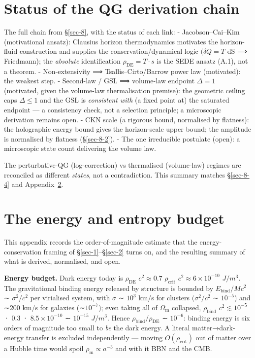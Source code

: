 \documentclass[preprint,12pt]{elsarticle}
\begin{document}
\section{Status of the QG derivation chain}\label{sec-E}

The full chain from §\ref{sec-8}, with the status of each link: -
Jacobson--Cai--Kim (motivational ansatz): Clausius horizon
thermodynamics motivates the horizon-fluid construction and supplies the
conservation/dynamical logic \((\delta Q = T\) dS ⟹ Friedmann); the
\emph{absolute} identification \(\rho _\mathrm{DE} = T\cdot s\) is the
SEDE ansatz (A.1), not a theorem. - Non-extensivity ⟹
Tsallis--Cirto/Barrow power law (motivated): the weakest step. -
Second-law / GSL ⟹ volume-law endpoint \(\Delta  = 1\) (motivated, given
the volume-law thermalisation premise): the geometric ceiling caps
\(\Delta  \leq  1\) and the GSL is \emph{consistent with} (a fixed point
at) the saturated endpoint --- a consistency check, not a selection
principle; a microscopic derivation remains open. - CKN scale (a
rigorous bound, normalised by flatness): the holographic energy bound
gives the horizon-scale upper bound; the amplitude is normalised by
flatness (§\ref{sec-8-2}). - The one irreducible postulate (open): a
microscopic state count delivering the volume law.

The perturbative-QG (log-correction) vs thermalised (volume-law) regimes
are reconciled as different \emph{states}, not a contradiction. This
summary matches §\ref{sec-8-4} and Appendix~\ref{sec-F}.

\section{The energy and entropy budget}\label{sec-F}

This appendix records the order-of-magnitude estimate that the
energy-conservation framing of §\ref{sec-1}--§\ref{sec-2} turns on, and
the resulting summary of what is derived, normalised, and open.

\textbf{Energy budget.} Dark energy today is \(\rho _\mathrm{DE}\)
\(c^{2} \approx  0.7\) \(\rho _{\mathrm{crit}}\)
\(c^{2} \approx  6\times 10^{-10}\) \(J/m^{3}\). The gravitational
binding energy released by structure is bounded by
\textbar{}\(E_{\mathrm{bind}}\)\textbar/\(Mc^{2}\) ∼
\(\sigma ^{2}/c^{2}\) per virialised system, with \(\sigma\) ∼
\(10^{3}\) km/s for clusters \((\sigma ^{2}/c^{2}\) ∼ \(10^{-5}\)) and
∼200 km/s for galaxies (∼\(10^{-7}\)); even taking all of
\(\Omega _{\mathrm{m}}\) collapsed, \(\rho _{\mathrm{bind}}\)
\(c^{2} \lesssim  10^{-5}\) · 0.3 · \(8.5\times 10^{-10}\) ∼
\(10^{-15}\) \(J/m^{3}\). Hence
\(\rho _{\mathrm{bind}}/\rho _\mathrm{DE}\) ∼ \(10^{-6}\): binding
energy is six orders of magnitude too small to \emph{be} the dark
energy. A literal matter→dark-energy transfer is excluded independently
--- moving \(O(\rho _{\mathrm{crit}})\) out of matter over a Hubble time
would spoil \(\rho _{\mathrm{m}} \propto  a^{-3}\) and with it BBN and
the CMB.
\end{document}
